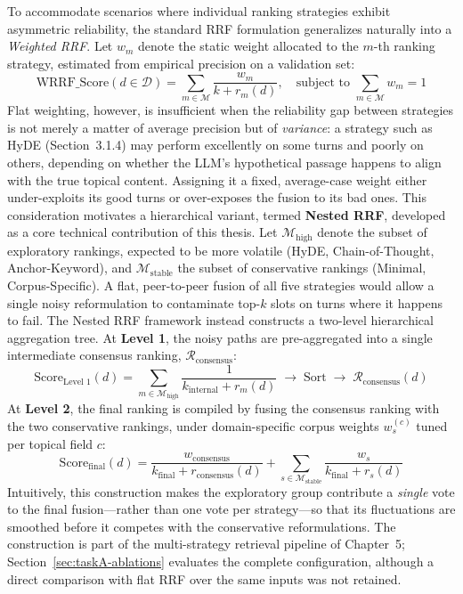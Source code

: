 To accommodate scenarios where individual ranking strategies exhibit asymmetric reliability, the standard RRF formulation generalizes naturally into a \textit{Weighted RRF}. Let $w_m$ denote the static weight allocated to the $m$-th ranking strategy, estimated from empirical precision on a validation set:
\begin{equation}
\text{WRRF\_Score}(d \in \mathcal{D}) = \sum_{m \in \mathcal{M}} \frac{w_m}{k + r_m(d)}, \quad \text{subject to } \sum_{m \in \mathcal{M}} w_m = 1
\end{equation}
Flat weighting, however, is insufficient when the reliability gap between strategies is not merely a matter of average precision but of \textit{variance}: a strategy such as HyDE (Section~3.1.4) may perform excellently on some turns and poorly on others, depending on whether the LLM's hypothetical passage happens to align with the true topical content. Assigning it a fixed, average-case weight either under-exploits its good turns or over-exposes the fusion to its bad ones. This consideration motivates a hierarchical variant, termed \textbf{Nested RRF}, developed as a core technical contribution of this thesis. Let $\mathcal{M}_{\text{high}}$ denote the subset of exploratory rankings, expected to be more volatile (HyDE, Chain-of-Thought, Anchor-Keyword), and $\mathcal{M}_{\text{stable}}$ the subset of conservative rankings (Minimal, Corpus-Specific). A flat, peer-to-peer fusion of all five strategies would allow a single noisy reformulation to contaminate top-$k$ slots on turns where it happens to fail. The Nested RRF framework instead constructs a two-level hierarchical aggregation tree. At \textbf{Level 1}, the noisy paths are pre-aggregated into a single intermediate consensus ranking, $\mathcal{R}_{\text{consensus}}$:
\begin{equation}
\text{Score}_{\text{Level 1}}(d) = \sum_{m \in \mathcal{M}_{\text{high}}} \frac{1}{k_{\text{internal}} + r_m(d)} \;\longrightarrow\; \text{Sort} \;\longrightarrow\; \mathcal{R}_{\text{consensus}}(d)
\end{equation}
At \textbf{Level 2}, the final ranking is compiled by fusing the consensus ranking with the two conservative rankings, under domain-specific corpus weights $w_s^{(c)}$ tuned per topical field $c$:
\begin{equation}
\text{Score}_{\text{final}}(d) = \frac{w_{\text{consensus}}}{k_{\text{final}} + r_{\text{consensus}}(d)} + \sum_{s \in \mathcal{M}_{\text{stable}}} \frac{w_s}{k_{\text{final}} + r_s(d)}
\end{equation}
Intuitively, this construction makes the exploratory group contribute a \textit{single} vote to the final fusion---rather than one vote per strategy---so that its fluctuations are smoothed before it competes with the conservative reformulations. The construction is part of the multi-strategy retrieval pipeline of Chapter~5; Section~\ref{sec:taskA-ablations} evaluates the complete configuration, although a direct comparison with flat RRF over the same inputs was not retained.

